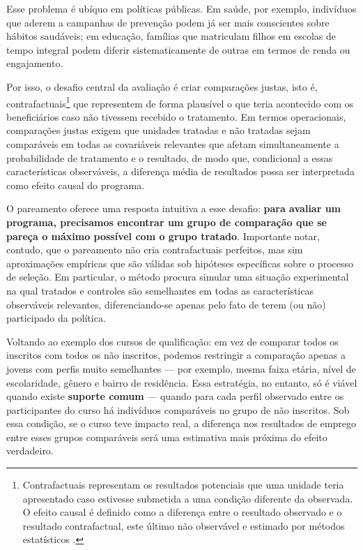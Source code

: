 \documentclass[12pt,a4paper]{article}
\begin{document}
Esse problema é ubíquo em políticas públicas. Em saúde, por exemplo, indivíduos que aderem a campanhas de prevenção podem já ser mais conscientes sobre hábitos saudáveis; em educação, famílias que matriculam filhos em escolas de tempo integral podem diferir sistematicamente de outras em termos de renda ou engajamento.

Por isso, o desafio central da avaliação é criar comparações justas, isto é, contrafactuais\footnote{Contrafactuais representam os resultados potenciais que uma unidade teria apresentado caso estivesse submetida a uma condição diferente da observada. O efeito causal é definido como a diferença entre o resultado observado e o resultado contrafactual, este último não observável e estimado por métodos estatísticos \citep{ImbensRubin2015}.} que representem de forma plausível o que teria acontecido com os beneficiários caso não tivessem recebido o tratamento. Em termos operacionais, comparações justas exigem que unidades tratadas e não tratadas sejam comparáveis em todas as covariáveis relevantes que afetam simultaneamente a probabilidade de tratamento e o resultado, de modo que, condicional a essas características observáveis, a diferença média de resultados possa ser interpretada como efeito causal do programa.

O pareamento oferece uma resposta intuitiva a esse desafio: \textbf{para avaliar um programa, precisamos encontrar um grupo de comparação que se pareça o máximo possível com o grupo tratado}. Importante notar, contudo, que o pareamento não cria contrafactuais perfeitos, mas sim aproximações empíricas que são válidas sob hipóteses específicas sobre o processo de seleção. Em particular, o método procura simular uma situação experimental na qual tratados e controles são semelhantes em todas as características observáveis relevantes, diferenciando-se apenas pelo fato de terem (ou não) participado da política.

Voltando ao exemplo dos cursos de qualificação: em vez de comparar todos os inscritos com todos os não inscritos, podemos restringir a comparação apenas a jovens com perfis muito semelhantes --- por exemplo, mesma faixa etária, nível de escolaridade, gênero e bairro de residência. Essa estratégia, no entanto, só é viável quando existe \textbf{suporte comum} --- quando para cada perfil observado entre os participantes do curso há indivíduos comparáveis no grupo de não inscritos. Sob essa condição, se o curso teve impacto real, a diferença nos resultados de emprego entre esses grupos comparáveis será uma estimativa mais próxima do efeito verdadeiro.
\end{document}
